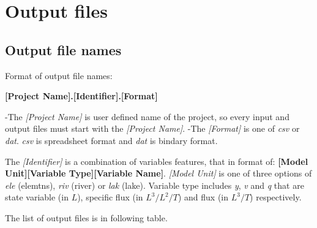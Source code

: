 \documentclass[]{scrbook}
\begin{document}
\chapter{Output files}\label{output-files}

\section{Output file names}\label{output-file-names}

Format of output file names:

\textbf{{[}Project Name{]}.{[}Identifier{]}.{[}Format{]}}

-The \emph{{[}Project Name{]}} is user defined name of the project, so
every input and output files must start with the \emph{{[}Project
Name{]}}. -The \emph{{[}Format{]}} is one of \emph{csv} or \emph{dat}.
\emph{csv} is spreadsheet format and \emph{dat} is bindary format.

The \emph{{[}Identifier{]}} is a combination of variables features, that
in format of: \textbf{{[}Model Unit{]}{[}Variable Type{]}{[}Variable
Name{]}}. \emph{{[}Model Unit{]}} is one of three options of \emph{ele}
(elemtns), \emph{riv} (river) or \emph{lak} (lake). Variable type
includes \emph{y}, \emph{v} and \emph{q} that are state variable (in
\(L\)), specific flux (in \(L^3/L^2/T\)) and flux (in \(L^3/T\))
respectively.

The list of output files is in following table.
\end{document}
